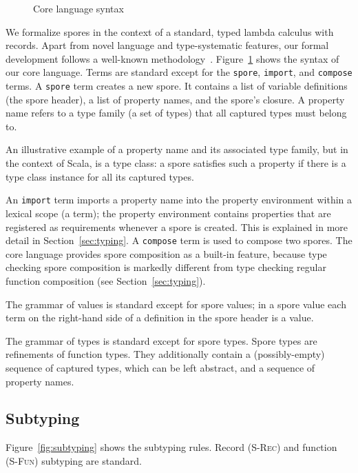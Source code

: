 \documentclass{llncs}
\begin{document}
\begin{figure}[ht!]
  \caption{Core language syntax}
  \label{fig:syntax}
\end{figure}


We formalize spores in the context of a standard, typed lambda calculus with records. Apart from novel language and type-systematic features, our formal development follows a well-known methodology~\cite{TAPL}. Figure~\ref{fig:syntax} shows the syntax of our core language. Terms are standard except for the \texttt{spore}, \texttt{import}, and \texttt{compose} terms. A \texttt{spore} term creates a new spore. It contains a list of variable definitions (the spore header), a list of property names, and the spore's closure. A property name refers to a type family (a set of types) that all captured types must belong to.

An illustrative example of a property name and its associated type family, but in the context of Scala, is a type class: a spore satisfies such a property if there is a type class instance for all its captured types.

An \texttt{import} term imports a property name into the property environment
within a lexical scope (a term); the property environment contains properties
that are registered as requirements whenever a spore is created. This is
explained in more detail in Section~\ref{sec:typing}. A \texttt{compose} term
is used to compose two spores. The core language provides spore composition as
a built-in feature, because type checking spore composition is markedly
different from type checking regular function composition (see
Section~\ref{sec:typing}).

The grammar of values is standard except for spore values; in a spore value each term on the right-hand side of a definition in the spore header is a value.

The grammar of types is standard except for spore types. Spore types are refinements of function types. They additionally contain a (possibly-empty) sequence of captured types, which can be left abstract, and a sequence of property names.

\subsection{Subtyping}\label{sec:subtyping}

Figure~\ref{fig:subtyping} shows the subtyping rules. Record (\textsc{S-Rec}) and function (\textsc{S-Fun}) subtyping are standard.
\end{document}
